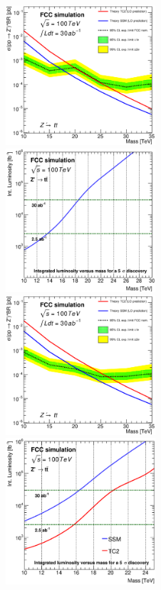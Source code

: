 \documentclass{cernrep}
\begin{document}
\begin{figure}[!htb]\centering
\includegraphics[width=0.495\textwidth]{Fig/Zptt/lim_Zprime_tt_fcc_v02_cut_TRFbtag.eps}
\includegraphics[width=0.495\textwidth]{Fig/Zptt/DiscoveryPotential_tt_cut_TRFbtag_rootStyle.eps}
\includegraphics[width=0.495\textwidth]{Fig/Zptt/lim_Zprime_tt_fcc_v02_tagger_TRFbtag.eps}
\includegraphics[width=0.495\textwidth]{Fig/Zptt/DiscoveryPotential_tt_SSM_TC2_tagger_TRFbtag_rootStyle.eps}

\end{figure}
\end{document}
